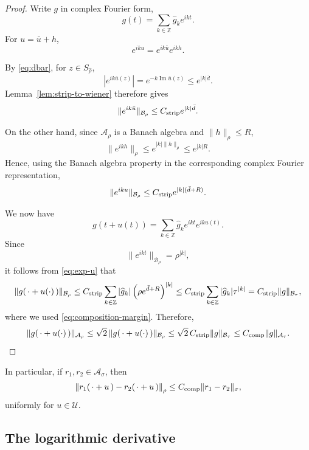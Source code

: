 \documentclass[11pt,a4paper]{amsart}
\begin{document}
\begin{proof}
	Write $g$ in complex Fourier form,
	\[
	g(t)
	=
	\sum_{k\in\mathbb Z}
	\widehat g_k e^{ikt}.
	\]
	For $u=\bar u+h$,
	\[
	e^{iku}
	=
	e^{ik\bar u}e^{ikh}.
	\]
	
	By \eqref{eq:dbar}, for $z\in S_{\widehat\rho}$,
	\[
	|e^{ik\bar u(z)}|
	=
	e^{-k\operatorname{Im}\bar u(z)}
	\le
	e^{|k|\bar d}.
	\]
	Lemma~\ref{lem:strip-to-wiener} therefore gives
	\begin{equation}\label{eq:exp-ubar}
		\|e^{ik\bar u}\|_{\mathcal B_\rho}
		\le
		C_{\rm strip}e^{|k|\bar d}.
	\end{equation}
	
	On the other hand, since $\mathcal A_\rho$ is a Banach algebra and
	$\|h\|_\rho\le R$,
	\[
	\|e^{ikh}\|_\rho
	\le
	e^{|k|\|h\|_\rho}
	\le
	e^{|k|R}.
	\]
	Hence, using the Banach algebra property in the corresponding
	complex Fourier representation,
	\begin{equation}\label{eq:exp-u}
		\|e^{iku}\|_{\mathcal B_\rho}
		\le
		C_{\rm strip}
		e^{|k|(\bar d+R)}.
	\end{equation}
	
	We now have
	\[
	g(t+u(t))
	=
	\sum_{k\in\mathbb Z}
	\widehat g_k e^{ikt}e^{iku(t)}.
	\]
	Since
	\[
	\|e^{ikt}\|_{\mathcal B_\rho}
	=
	\rho^{|k|},
	\]
	it follows from \eqref{eq:exp-u} that
	\[
		\|g(\,\cdot+u(\cdot)\,)\|_{\mathcal B_\rho}\le C_{\rm strip}\sum_{k\in\mathbb Z}
		|\widehat g_k|\left(\rho e^{\bar d+R}\right)^{|k|}\le
		C_{\rm strip}\sum_{k\in\mathbb Z}|\widehat g_k|\tau^{|k|}=
		C_{\rm strip}\|g\|_{\mathcal B_\tau},
	\]
	where we used \eqref{eq:composition-margin}.
	Therefore,
	\[
		\|g(\,\cdot+u(\cdot)\,)\|_{\mathcal A_\rho}\le \sqrt2\,
		\|g(\,\cdot+u(\cdot)\,)\|_{\mathcal B_\rho}
		\le \sqrt2\,C_{\rm strip}\|g\|_{\mathcal B_\tau}
		\le C_{\rm comp}\|g\|_{\mathcal A_\tau}.
	\]
\end{proof}

In particular, if $r_1,r_2\in\mathcal A_\sigma$, then
\begin{equation}\label{eq:r-composition-difference}
	\left\|
	r_1(\,\cdot+u\,)
	-
	r_2(\,\cdot+u\,)
	\right\|_\rho
	\le
	C_{\rm comp}
	\|r_1-r_2\|_\sigma,
\end{equation}
uniformly for $u\in\mathcal U$.


\subsection{The logarithmic derivative}\label{ssec:logarithmic-derivative}
\end{document}
